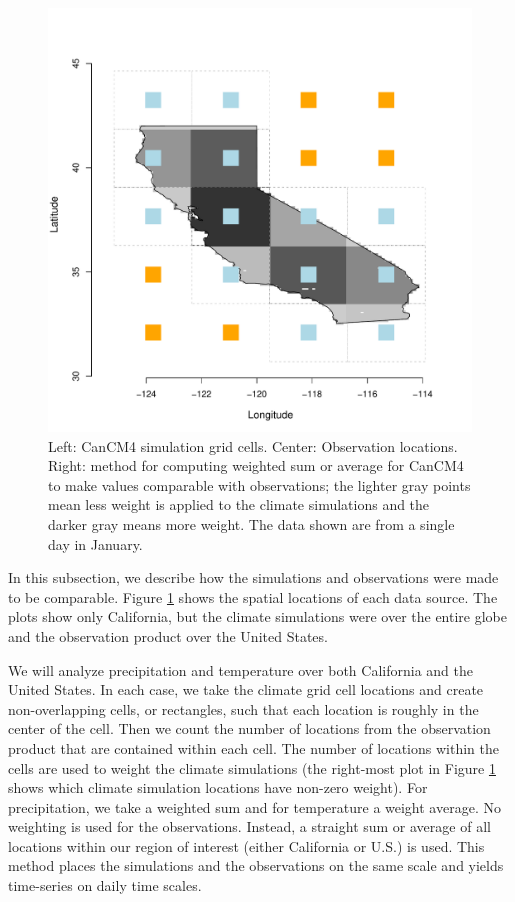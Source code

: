 \begin{figure}
\begin{center}
\includegraphics[scale=0.26]{figs/cal_mod_box3.pdf}
\end{center}
\caption{Left: CanCM4 simulation grid cells. Center: Observation locations. Right: method for computing weighted sum or average for CanCM4 to make values comparable with observations; the lighter gray points mean less weight is applied to the climate simulations and the darker gray means more weight. The data shown are from a single day in January.}
\label{weight}
\end{figure}

In this subsection, we describe how the simulations and observations were made to be comparable. Figure \ref{weight} shows the spatial locations of each data source. The plots show only California, but the climate simulations were over the entire globe and the observation product over the United States.

We will analyze precipitation and temperature over both California and the United States. In each case, we take the climate grid cell locations and create non-overlapping cells, or rectangles, such that each location is roughly in the center of the cell. Then we count the number of locations from the observation product that are contained within each cell. The number of locations within the cells are used to weight the climate simulations (the right-most plot in Figure \ref{weight} shows which climate simulation locations have non-zero weight). For precipitation, we take a weighted sum and for temperature a weight average. No weighting is used for the observations. Instead, a straight sum or average of all locations within our region of interest (either California or U.S.) is used. This method places the simulations and the observations on the same scale and yields time-series on daily time scales.

